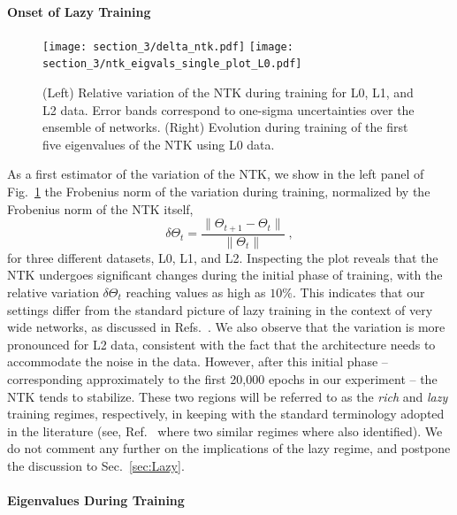 \paragraph{Onset of Lazy Training} 

\begin{figure}[t]
  \centering
  \texttt{[image: section\_3/delta\_ntk.pdf]}
  \texttt{[image: section\_3/ntk\_eigvals\_single\_plot\_L0.pdf]} 
  \caption{(Left) Relative variation of the NTK during training for L0, L1, and
  L2 data. Error bands correspond to one-sigma uncertainties over the ensemble
  of networks. (Right) Evolution during training of the first five eigenvalues
  of the NTK using L0 data.}
  \label{fig:NTKTime}
\end{figure}

As a first estimator of the variation of the NTK, we show in the left panel of
Fig.~\ref{fig:NTKTime} the Frobenius norm of the variation during training,
normalized by the Frobenius norm of the NTK itself, 
\begin{equation}
\delta \Theta_t = \frac{\lVert \Theta_{t+1} - \Theta_t \rVert}{\lVert \Theta_t \rVert} \;,
\label{eq:DeltaNTK}
\end{equation}
for three different datasets, L0, L1, and L2. Inspecting the plot reveals that
the NTK undergoes significant changes during the initial phase of training, with
the relative variation $\delta \Theta_t$ reaching values as high as $10\%$. This
indicates that our settings differ from the standard picture of lazy training in
the context of very wide networks, as discussed in
Refs.~\cite{jacot2018neural,Roberts:2021fes,lee2019wide}. We also observe that
the variation is more pronounced for L2 data, consistent with the fact that the
architecture needs to accommodate the noise in the data. However, after this
initial phase -- corresponding approximately to the first 20,000 epochs in our
experiment -- the NTK tends to stabilize. These two regions will be referred to
as the \textit{rich} and \textit{lazy} training regimes, respectively, in
keeping with the standard terminology adopted in the literature (see, \eg
Ref.~\cite{fort2020dlvk} where two similar regimes where also identified). We do
not comment any further on the implications of the lazy regime, and postpone the
discussion to Sec.~\ref{sec:Lazy}.

\FloatBarrier

\paragraph{Eigenvalues During Training}

